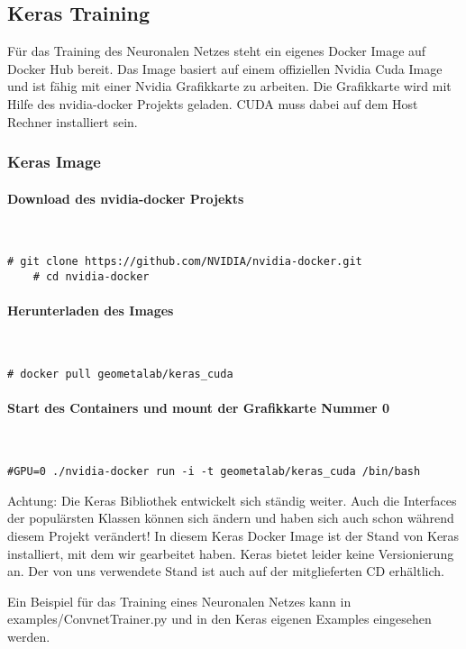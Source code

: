 \newpage
\subsection{Keras Training}
Für das Training des Neuronalen Netzes steht ein eigenes Docker Image \cite{DokerKeras} auf Docker Hub bereit. Das Image basiert auf einem offiziellen Nvidia Cuda Image und ist fähig mit einer Nvidia Grafikkarte zu arbeiten. Die Grafikkarte wird mit Hilfe des nvidia-docker Projekts geladen. CUDA muss dabei auf dem Host Rechner installiert sein.


\subsubsection{Keras Image}
\paragraph{Download des nvidia-docker Projekts}\mbox{}\\
\begin{lstlisting}[style=BashInputStyle]
	# git clone https://github.com/NVIDIA/nvidia-docker.git
	# cd nvidia-docker
\end{lstlisting}

\paragraph{Herunterladen des Images}\mbox{}\\
\begin{lstlisting}[style=BashInputStyle]
	# docker pull geometalab/keras_cuda
\end{lstlisting}

\paragraph{Start des Containers und mount der Grafikkarte Nummer 0}\mbox{}\\
\begin{lstlisting}[style=BashInputStyle]
	#GPU=0 ./nvidia-docker run -i -t geometalab/keras_cuda /bin/bash
\end{lstlisting}

Achtung: Die Keras Bibliothek entwickelt sich ständig weiter. Auch die Interfaces der populärsten Klassen können sich ändern und haben sich auch schon während diesem Projekt verändert! In diesem Keras Docker Image ist der Stand von Keras installiert, mit dem wir gearbeitet haben. Keras bietet leider keine Versionierung an. Der von uns verwendete Stand ist auch auf der mitglieferten CD erhältlich.

Ein Beispiel für das Training eines Neuronalen Netzes kann in examples/ConvnetTrainer.py und in den Keras eigenen Examples eingesehen werden.